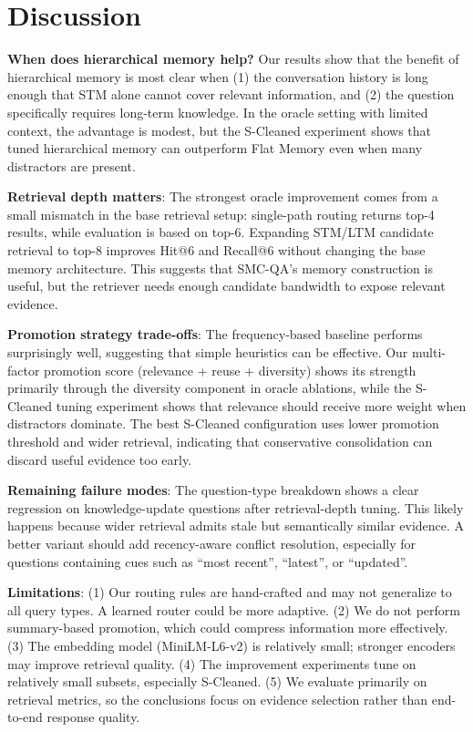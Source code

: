 \documentclass{article}
\begin{document}
\section{Discussion}

\textbf{When does hierarchical memory help?} Our results show that the benefit of hierarchical memory is most clear when (1) the conversation history is long enough that STM alone cannot cover relevant information, and (2) the question specifically requires long-term knowledge. In the oracle setting with limited context, the advantage is modest, but the S-Cleaned experiment shows that tuned hierarchical memory can outperform Flat Memory even when many distractors are present.

\textbf{Retrieval depth matters}: The strongest oracle improvement comes from a small mismatch in the base retrieval setup: single-path routing returns top-4 results, while evaluation is based on top-6. Expanding STM/LTM candidate retrieval to top-8 improves Hit@6 and Recall@6 without changing the base memory architecture. This suggests that SMC-QA's memory construction is useful, but the retriever needs enough candidate bandwidth to expose relevant evidence.

\textbf{Promotion strategy trade-offs}: The frequency-based baseline performs surprisingly well, suggesting that simple heuristics can be effective. Our multi-factor promotion score (relevance + reuse + diversity) shows its strength primarily through the diversity component in oracle ablations, while the S-Cleaned tuning experiment shows that relevance should receive more weight when distractors dominate. The best S-Cleaned configuration uses lower promotion threshold and wider retrieval, indicating that conservative consolidation can discard useful evidence too early.

\textbf{Remaining failure modes}: The question-type breakdown shows a clear regression on knowledge-update questions after retrieval-depth tuning. This likely happens because wider retrieval admits stale but semantically similar evidence. A better variant should add recency-aware conflict resolution, especially for questions containing cues such as ``most recent'', ``latest'', or ``updated''.

\textbf{Limitations}: (1) Our routing rules are hand-crafted and may not generalize to all query types. A learned router could be more adaptive. (2) We do not perform summary-based promotion, which could compress information more effectively. (3) The embedding model (MiniLM-L6-v2) is relatively small; stronger encoders may improve retrieval quality. (4) The improvement experiments tune on relatively small subsets, especially S-Cleaned. (5) We evaluate primarily on retrieval metrics, so the conclusions focus on evidence selection rather than end-to-end response quality.
\end{document}
